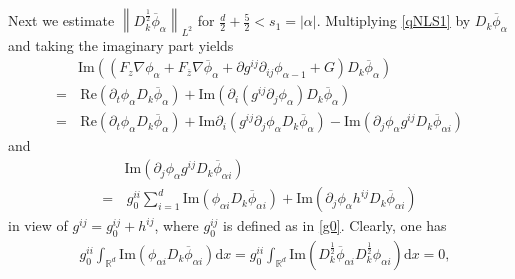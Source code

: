 \documentclass[10pt,twoside,a4paper]{article}
\numberwithin{equation}{section}\allowdisplaybreaks
\begin{document}
Next we   estimate  $ \left\| D_k^{\frac 12} \overline{\phi}_{\alpha } \right\|_{L^2} $ for $\frac d2+\frac 52< s_1=|\alpha| $. Multiplying \eqref{qNLS1} by
$D_k \overline{\phi}_{\alpha } $ and taking the imaginary part yields	
\begin{align}  \label{qecons2_1}
	&\mathrm{Im} \left(  \left(F_z\nabla \phi_\alpha+F_{\overline{z}}\nabla \overline{\phi}_\alpha+\partial g^{ij}\partial_{ij } \phi_{\alpha -1}+G\right)D_k\overline{\phi}_{\alpha } \right)\nonumber\\
	=&\,\mathrm{Re}\left( \partial_t\phi_{\alpha } D_k\overline{\phi}_{\alpha }  \right)+ \mathrm{Im} \left(  \partial_i\left(   g^{ij} \partial_j \phi_{\alpha }\right)D_k \overline{\phi}_{\alpha }\right) \nonumber\\
	=&\, \mathrm{Re}\left( \partial_t\phi_{\alpha } D_k\overline{\phi}_{\alpha }  \right)+ \mathrm{Im} \partial_i\left(   g^{ij} \partial_j \phi_{\alpha }D_k \overline{\phi}_{\alpha }\right)- \mathrm{Im} \left(   \partial_j \phi_{\alpha } g^{ij} D_k \overline{\phi}_{\alpha i }\right) 
\end{align}	
and 
\begin{align*} 
	&\mathrm{Im} \left(   \partial_j \phi_{\alpha }  g^{ij}  D_k  \overline{\phi}_{\alpha i }\right)\nonumber\\
	=&\,g^{ii}_0\sum_{i=1}^d\mathrm{Im} \left(   \phi_{\alpha i}     D_k  \overline{\phi}_{\alpha i }\right)+\mathrm{Im} \left(   \partial_j \phi_{\alpha }  h^{ij}  D_k  \overline{\phi}_{\alpha i }\right)
\end{align*}
in view of $ g^{ij}=g^{ij}_0+h^{ij} $, where $ g^{ij}_0 $ is defined as in \eqref{g0}.
Clearly,   one has
\begin{align*} 
	&g^{ii}_0 \int_{\mathbb{R}^d}	\mathrm{Im} \left(  \phi_{\alpha i}     D_k  \overline{\phi}_{\alpha i }\right) \mathrm{d} x = g^{ii}_0 \int_{\mathbb{R}^d}\mathrm{Im} \left( D_k^{\frac 12}\overline{\phi}_{\alpha i }  D_k^{\frac 12} \phi_{\alpha i}\right) \mathrm{d} x =0	,
\end{align*}
\end{document}

